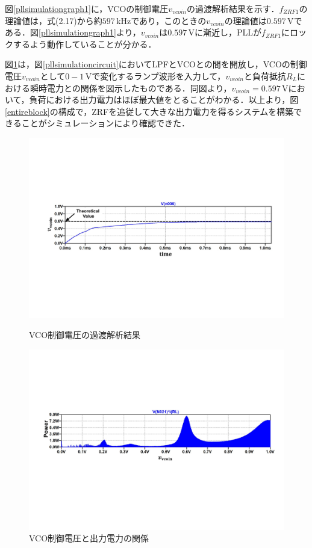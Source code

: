 図\ref{pllsimulationgraph1}に，VCOの制御電圧$v_{vcoin}$の過渡解析結果を示す．$f_{ZRF1}$の理論値は，式(2.17)から約$597 \, \mathrm{kHz}$であり，このときの$v_{vcoin}$の理論値は$0.597 \, \mathrm{V}$である．図\ref{pllsimulationgraph1}より，$v_{vcoin}$は$0.597 \, \mathrm{V}$に漸近し，PLLが$f_{ZRF1}$にロックするよう動作していることが分かる．\par 
図\ref{pllsimulationgraph2}は，図\ref{pllsimulationcircuit}においてLPFとVCOとの間を開放し，VCOの制御電圧$v_{vcoin}$として$0-1 \, \mathrm{V}$で変化するランプ波形を入力して，$v_{vcoin}$と負荷抵抗$R_L$における瞬時電力との関係を図示したものである．同図より，$v_{vcoin}=0.597 \, \mathrm{V}$において，負荷における出力電力はほぼ最大値をとることがわかる．以上より，図\ref{entireblock}の構成で，ZRFを追従して大きな出力電力を得るシステムを構築できることがシミュレーションにより確認できた．
\begin{figure}[h]
\begin{center}

\includegraphics[width=150mm]{figures/pllsimulationgraph1.pdf}
\caption{VCO制御電圧の過渡解析結果}
\label{pllsimulationgraph1}

\vspace{1cm}

\includegraphics[width=150mm]{figures/pllsimulationgraph2.pdf}
\caption{VCO制御電圧と出力電力の関係}
\label{pllsimulationgraph2}

\end{center}
\end{figure}
